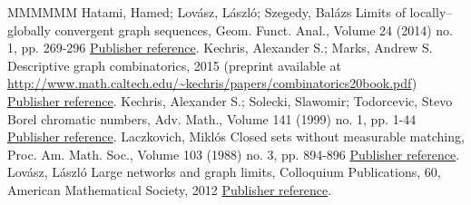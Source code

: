 \documentclass[11pt]{article}
\theoremstyle{definition}
\numberwithin{equation}{section}
\numberwithin{figure}{section}
\numberwithin{table}{section}
\begin{document}
\begin{thebibliography}{MMMMMM}
 Hatami, Hamed; Lovász, László; Szegedy, Balázs Limits of locally–globally convergent graph sequences, Geom. Funct. Anal., Volume 24 (2014) no. 1, pp. 269-296 \href{https://ahl.centre-mersenne.org/item/AHL_2021__4__1705_0/#hatami2014limits}{Publisher reference}.
 Kechris, Alexander S.; Marks, Andrew S. Descriptive graph combinatorics, 2015 (preprint available at \url{http://www.math.caltech.edu/~kechris/papers/combinatorics20book.pdf}) \href{https://ahl.centre-mersenne.org/item/AHL_2021__4__1705_0/#kechris2015descriptive}{Publisher reference}.
 Kechris, Alexander S.; Solecki, Slawomir; Todorcevic, Stevo Borel chromatic numbers, Adv. Math., Volume 141 (1999) no. 1, pp. 1-44 \href{https://ahl.centre-mersenne.org/item/AHL_2021__4__1705_0/#kechris1999borel}{Publisher reference}.
 Laczkovich, Miklós Closed sets without measurable matching, Proc. Am. Math. Soc., Volume 103 (1988) no. 3, pp. 894-896 \href{https://ahl.centre-mersenne.org/item/AHL_2021__4__1705_0/#laczkovich1988closed}{Publisher reference}.
 Lovász, László Large networks and graph limits, Colloquium Publications, 60, American Mathematical Society, 2012 \href{https://ahl.centre-mersenne.org/item/AHL_2021__4__1705_0/#lovasz2012large}{Publisher reference}.
\end{thebibliography}
\end{document}
